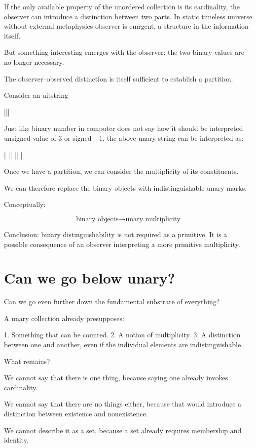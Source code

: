 If the only available property of the unordered collection is its cardinality, the observer can introduce a distinction between two parts.
In static timeless universe without external metaphysics observer is emrgent, a structure in the information itself.  

But something interesting emerges with the observer: the two binary values are no longer necessary.

The observer–observed distinction is itself sufficient to establish a partition.

Consider an uitstring

|||

Just like binary number in computer does not say how it should be interpreted unsigned value of $3$ or signed $-1$, the above unary string
can be interpreted as:

| ||
|| |


Once we have a partition, we can consider the multiplicity of its constituents.

We can therefore replace the binary objects with indistinguishable unary marks.

Conceptually:

\[
\text{binary objects} \longrightarrow \text{unary multiplicity}
\]

Conclusion: binary distinguishability is not required as a primitive.
It is a possible consequence of an observer interpreting a more primitive multiplicity.




\section{Can we go below unary?}

Can we go even further down the fundamental substrate of everything? 

A unary collection already presupposes:

1. Something that can be counted.
2. A notion of multiplicity.
3. A distinction between one and another, even if the individual elements are indistinguishable.

What remains?

We cannot say that there is one thing, because saying one already invokes cardinality.

We cannot say that there are no things either, because that would introduce a distinction between existence and nonexistence.

We cannot describe it as a set, because a set already requires membership and identity.

